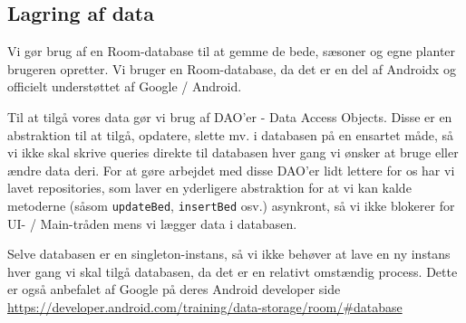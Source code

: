 \subsection{Lagring af data}
Vi gør brug af en Room-database til at gemme de bede, sæsoner og egne planter brugeren opretter. Vi bruger en Room-database, da det er en del af Androidx og officielt understøttet af Google / Android. 

Til at tilgå vores data gør vi brug af DAO'er - Data Access Objects. Disse er en abstraktion til at tilgå, opdatere, slette mv. i databasen på en ensartet måde, så vi ikke skal skrive queries direkte til databasen hver gang vi ønsker at bruge eller ændre data deri.
For at gøre arbejdet med disse DAO'er lidt lettere for os har vi lavet repositories, som laver en yderligere abstraktion for at vi kan kalde metoderne (såsom \texttt{updateBed}, \texttt{insertBed} osv.) asynkront, så vi ikke blokerer for UI- / Main-tråden mens vi lægger data i databasen.

Selve databasen er en singleton-instans, så vi ikke behøver at lave en ny instans hver gang vi skal tilgå databasen, da det er en relativt omstændig process. Dette er også anbefalet af Google på deres Android developer side \hyperlink{https://developer.android.com/training/data-storage/room/#database}{https://developer.android.com/training/data-storage/room/#database}
